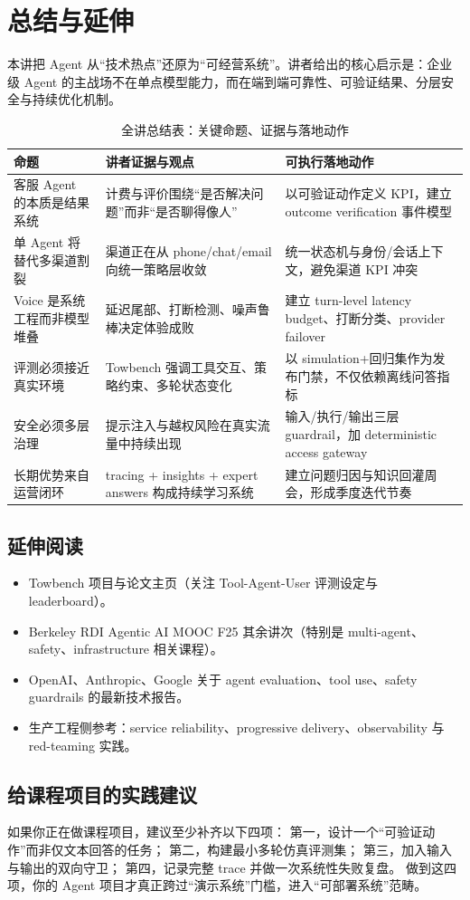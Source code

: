 \section{总结与延伸}

本讲把 Agent 从“技术热点”还原为“可经营系统”。讲者给出的核心启示是：企业级 Agent 的主战场不在单点模型能力，而在端到端可靠性、可验证结果、分层安全与持续优化机制。

\begin{table}[H]
\centering
\caption{全讲总结表：关键命题、证据与落地动作}
\begin{tabularx}{\textwidth}{>{\raggedright\arraybackslash}p{3.1cm} >{\raggedright\arraybackslash}X >{\raggedright\arraybackslash}p{4.2cm}}
\toprule
命题 & 讲者证据与观点 & 可执行落地动作 \\
\midrule
客服 Agent 的本质是结果系统 & 计费与评价围绕“是否解决问题”而非“是否聊得像人” & 以可验证动作定义 KPI，建立 outcome verification 事件模型 \\
单 Agent 将替代多渠道割裂 & 渠道正在从 phone/chat/email 向统一策略层收敛 & 统一状态机与身份/会话上下文，避免渠道 KPI 冲突 \\
Voice 是系统工程而非模型堆叠 & 延迟尾部、打断检测、噪声鲁棒决定体验成败 & 建立 turn-level latency budget、打断分类、provider failover \\
评测必须接近真实环境 & Towbench 强调工具交互、策略约束、多轮状态变化 & 以 simulation+回归集作为发布门禁，不仅依赖离线问答指标 \\
安全必须多层治理 & 提示注入与越权风险在真实流量中持续出现 & 输入/执行/输出三层 guardrail，加 deterministic access gateway \\
长期优势来自运营闭环 & tracing + insights + expert answers 构成持续学习系统 & 建立问题归因与知识回灌周会，形成季度迭代节奏 \\
\bottomrule
\end{tabularx}
\end{table}

\subsection{延伸阅读}

\begin{itemize}[leftmargin=1.5em]
    \item Towbench 项目与论文主页（关注 Tool-Agent-User 评测设定与 leaderboard）。
    \item Berkeley RDI Agentic AI MOOC F25 其余讲次（特别是 multi-agent、safety、infrastructure 相关课程）。
    \item OpenAI、Anthropic、Google 关于 agent evaluation、tool use、safety guardrails 的最新技术报告。
    \item 生产工程侧参考：service reliability、progressive delivery、observability 与 red-teaming 实践。
\end{itemize}

\subsection{给课程项目的实践建议}

如果你正在做课程项目，建议至少补齐以下四项：
第一，设计一个“可验证动作”而非仅文本回答的任务；
第二，构建最小多轮仿真评测集；
第三，加入输入与输出的双向守卫；
第四，记录完整 trace 并做一次系统性失败复盘。
做到这四项，你的 Agent 项目才真正跨过“演示系统”门槛，进入“可部署系统”范畴。


